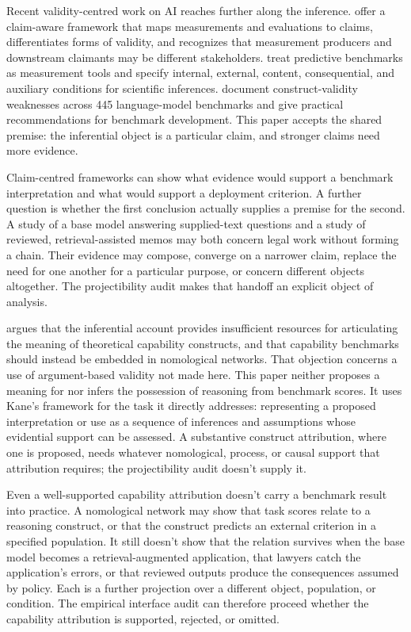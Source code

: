 \documentclass[12pt]{article}
\begin{document}
Recent validity-centred work on AI reaches further along the inference. \Textcite{salaudeen2025measurement} offer a claim-aware framework that maps measurements and evaluations to claims, differentiates forms of validity, and recognizes that measurement producers and downstream claimants may be different stakeholders. \Textcite{freieslebenZezulka2025benchmarking} treat predictive benchmarks as measurement tools and specify internal, external, content, consequential, and auxiliary conditions for scientific inferences. \Textcite{bean2025measuring} document construct-validity weaknesses across 445 language-model benchmarks and give practical recommendations for benchmark development. This paper accepts the shared premise: the inferential object is a particular claim, and stronger claims need more evidence.

Claim-centred frameworks can show what evidence would support a benchmark interpretation and what would support a deployment criterion. A further question is whether the first conclusion actually supplies a premise for the second. A study of a base model answering supplied-text questions and a study of reviewed, retrieval-assisted memos may both concern legal work without forming a chain. Their evidence may compose, converge on a narrower claim, replace the need for one another for a particular purpose, or concern different objects altogether. The projectibility audit makes that handoff an explicit object of analysis.

\Textcite{freiesleben2026establishing} argues that the inferential account provides insufficient resources for articulating the meaning of theoretical capability constructs, and that capability benchmarks should instead be embedded in nomological networks. That objection concerns a use of argument-based validity not made here. This paper neither proposes a meaning for  nor infers the possession of reasoning from benchmark scores. It uses Kane's framework for the task it directly addresses: representing a proposed interpretation or use as a sequence of inferences and assumptions whose evidential support can be assessed. A substantive construct attribution, where one is proposed, needs whatever nomological, process, or causal support that attribution requires; the projectibility audit doesn't supply it.

Even a well-supported capability attribution doesn't carry a benchmark result into practice. A nomological network may show that task scores relate to a reasoning construct, or that the construct predicts an external criterion in a specified population. It still doesn't show that the relation survives when the base model becomes a retrieval-augmented application, that lawyers catch the application's errors, or that reviewed outputs produce the consequences assumed by policy. Each is a further projection over a different object, population, or condition. The empirical interface audit can therefore proceed whether the capability attribution is supported, rejected, or omitted.
\end{document}
